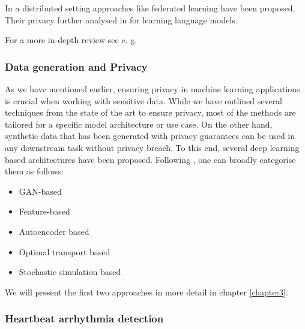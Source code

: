 In a distributed setting approaches like federated learning \parencite{konečný2015federated,Mo2019EfficientAP} have been proposed. Their privacy further analysed in \parencite{mcmahan2018learning} for learning language models.

\vspace*{1em}
For a more in-depth review see e. g. \parencite{surrve_ppml,surv_ppml_2,wang2023differential}


\subsubsection*{Data generation and Privacy}

As we have mentioned earlier, ensuring privacy in machine learning applications is crucial when working with sensitive data. While we have outlined several techniques from the state of the art to ensure privacy, most of the methods are tailored for a specific model architecture or use case. On the other hand, synthetic data that has been generated with privacy guarantees can be used in any downstream task without privacy breach. To this end, several deep learning based architectures have been proposed. Following \parencite{hu2023sok}, one can broadly categorise them as follows:
\begin{itemize}
    \item GAN-based
    \item Feature-based
    \item Autoencoder based {\tiny \Parencite[see e. g.][for a generator based on a variational autoencoder that is trained with DP-SGD]{vae}}
    \item Optimal transport based {\tiny \Parencite[see e. g.][for generator based on the so-called Sinkhorn divergence]{cao2021dont}}
    \item Stochastic simulation based {\tiny \Parencite[see e. g.][for a differentially-private diffusion model]{dpgen}}
\end{itemize}

We will present the first two approaches in more detail in chapter \ref{chapter3}.

\subsubsection*{Heartbeat arrhythmia detection}